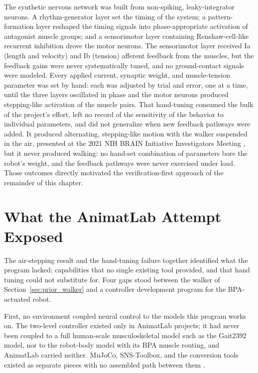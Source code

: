 The synthetic nervous network was built from non-spiking, leaky-integrator neurons. A rhythm-generator layer set the timing of the system; a pattern-formation layer reshaped the timing signals into phase-appropriate activation of antagonist muscle groups; and a sensorimotor layer containing Renshaw-cell-like recurrent inhibition drove the motor neurons. The sensorimotor layer received Ia (length and velocity) and Ib (tension) afferent feedback from the muscles, but the feedback gains were never systematically tuned, and no ground-contact signals were modeled. Every applied current, synaptic weight, and muscle-tension parameter was set by hand: each was adjusted by trial and error, one at a time, until the three layers oscillated in phase and the motor neurons produced stepping-like activation of the muscle pairs. That hand-tuning consumed the bulk of the project's effort, left no record of the sensitivity of the behavior to individual parameters, and did not generalize when new feedback pathways were added. It produced alternating, stepping-like motion with the walker suspended in the air, presented at the 2021 NIH BRAIN Initiative Investigators Meeting \citep{bolenTorqueValuesArtificialKnee2021June15-17}, but it never produced walking: no hand-set combination of parameters bore the robot's weight, and the feedback pathways were never exercised under load. Those outcomes directly motivated the verification-first approach of the remainder of this chapter.

\section{What the AnimatLab Attempt Exposed}\label{sec:sns_gaps}

The air-stepping result and the hand-tuning failure together identified what the program lacked: capabilities that no single existing tool provided, and that hand tuning could not substitute for. Four gaps stood between the walker of Section~\ref{sec:prior_walker} and a controller development program for the BPA-actuated robot.

First, no environment coupled neural control to the models this program works on. The two-level controller existed only in AnimatLab projects; it had never been coupled to a full human-scale musculoskeletal model such as the Gait2392 model, nor to the robot-body model with its BPA muscle routing, and AnimatLab carried neither. MuJoCo, SNS-Toolbox, and the conversion tools existed as separate pieces with no assembled path between them \citep{todorov_mujoco_2012, nourse_sns_2023}.

